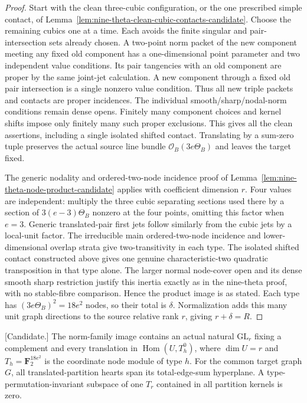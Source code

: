 \begin{proof}
Start with the clean three-cubic configuration, or the one prescribed
simple contact, of
Lemma~\ref{lem:nine-theta-clean-cubic-contacts-candidate}.
Choose the remaining cubics one at a time. Each avoids the finite
singular and pair-intersection sets already chosen. A two-point
norm packet of the new component meeting any fixed old component
has a one-dimensional point parameter and two independent value
conditions. Its pair tangencies with an old component are proper
by the same joint-jet calculation. A new component through a fixed
old pair intersection is a single nonzero value condition. Thus
all new triple packets and contacts are proper incidences.
The individual smooth/sharp/nodal-norm conditions remain dense
opens. Finitely many component choices and kernel shifts impose
only finitely many such proper exclusions. This gives all the
clean assertions, including a single isolated shifted contact.
Translating by a sum-zero tuple preserves the actual source
line bundle $\mathcal O_B(3e\Theta_B)$ and leaves the target fixed.

The generic nodality and ordered-two-node incidence proof of
Lemma~\ref{lem:nine-theta-node-product-candidate} applies with
coefficient dimension $r$. Four values are independent: multiply
the three cubic separating sections used there by a section of
$3(e-3)\Theta_B$ nonzero at the four points, omitting this factor
when $e=3$. Generic translated-pair first jets follow similarly
from the cubic jets by a local-unit factor. The irreducible main
ordered-two-node incidence and lower-dimensional overlap strata
give two-transitivity in each type. The isolated shifted contact
constructed above gives one genuine characteristic-two quadratic
transposition in that type alone. The larger normal node-cover
open and its dense smooth sharp restriction justify this inertia
exactly as in the nine-theta proof, with no stable-fibre comparison.
Hence the product image is as stated. Each type has
$(3e\Theta_B)^2=18e^2$ nodes, so their total is $\delta$.
Normalization adds this many unit graph directions to the source
relative rank $r$, giving $r+\delta=R$.
\end{proof}

\begin{proposition}
\label{prop:cubic-component-weighted-graph-gluing-candidate}
\textup{[Candidate.]}
The norm-family image contains an actual natural
$\mathrm{GL}_r$ fixing a complement and every translation in
$\operatorname{Hom}(U,T_h^0)$, where $\dim U=r$ and
$T_h=\mathbf F_2^{18e^2}$ is the coordinate node module of type $h$.
For the common target graph $G$, all translated-partition hearts
span its total-edge-sum hyperplane. A type-permutation-invariant
subspace of one $T_r$ contained in all partition kernels is zero.
\end{proposition}

